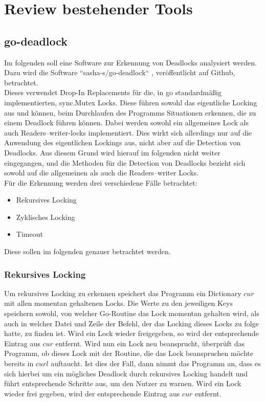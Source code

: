 \chapter{Review bestehender Tools}
\section{go-deadlock}\label{Chap::Review:go-deadlock}
Im folgenden soll eine Software zur Erkennung von Deadlocks analysiert werden.
Dazu wird die Software ``sasha-s/go-deadlock`` \cite{sasha-s}, veröffentlicht 
auf Github, betrachtet.\\
Dieses verwendet Drop-In Replacements für die, in go standardmäßig 
implementierten, sync.Mutex Locks. Diese führen sowohl das eigentliche 
Locking aus und können, beim Durchlaufen des Programms Situationen erkennen, 
die zu einem Deadlock führen können. Dabei werden sowohl ein allgemeines Lock 
als auch Readers–writer-locks implementiert. Dies wirkt sich allerdings nur auf
die Anwendung des eigentlichen Lockings aus, nicht aber auf die Detection von 
Deadlocks. Aus diesem Grund wird hierauf im folgenden nicht weiter eingegangen, 
und die Methoden für die Detection von Deadlocks bezieht sich sowohl auf die
allgemeinen als auch die Readers–writer Locks.\\
Für die Erkennung werden drei verschiedene Fälle betrachtet:
\begin{itemize}
    \item Rekursives Locking
    \item Zyklisches Locking
    \item Timeout
\end{itemize}
Diese sollen im folgenden genauer betrachtet werden.

\subsection{Rekursives Locking}\label{Kap::Rev:Recursive}
Um rekursives Locking zu erkennen speichert das Programm ein Dictionary $cur$ mit 
allen momentan gehaltenen 
Locks. Die Werte zu den jeweiligen Keys speichern sowohl, von welcher Go-Routine das 
Lock momentan gehalten wird, als auch in welcher Datei und Zeile der Befehl,
der das Locking dieses Locks zu folge hatte, zu finden ist. Wird ein Lock 
wieder freigegeben, so wird der entsprechende Eintrag aus $cur$ entfernt. 
Wird nun ein Lock neu beansprucht, überprüft 
das Programm, ob dieses Lock mit der Routine, die das Lock beanspruchen möchte 
bereits in $curl$ auftaucht. Ist dies der Fall, dann nimmt das
Programm an, dass es sich hierbei um ein mögliches Deadlock durch rekursives Locking
handelt und führt 
entsprechende Schritte aus, um den Nutzer zu warnen. Wird ein Lock wieder frei
gegeben, wird der entsprechende Eintrag aus $cur$ entfernt.

